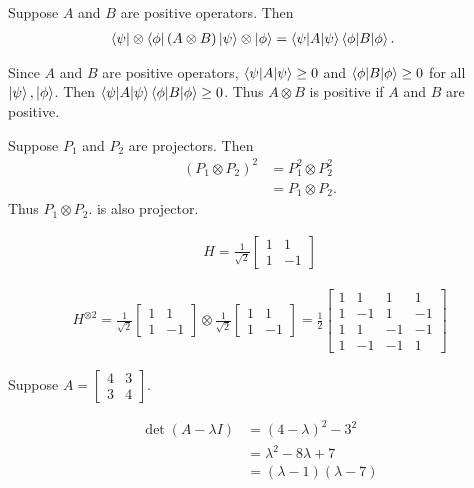 Suppose $A$ and $B$ are positive operators. Then
\begin{align*}
	\bra{\psi} \otimes \bra{\phi} (A \otimes B) \ket{\psi} \otimes \ket{\phi} &= \braket{\psi |A| \psi} \braket{\phi | B | \phi}.
\end{align*}

Since $A$ and $B$ are positive operators,
$\braket{\psi |A| \psi} \geq 0$ and $\braket{\phi | B | \phi} \geq 0$ for all $\ket{\psi}, \ket{\phi} $.
Then $\braket{\psi |A| \psi} \braket{\phi | B | \phi} \geq 0$.
Thus $A \otimes B$ is positive if $A$ and $B$ are positive.



Suppose $P_1$ and $P_2$  are projectors. Then
\begin{align*}
	(P_1 \otimes P_2) ^2 &= P_1^2 \otimes P_2^2\\
		&= P_1 \otimes P_2.
\end{align*}
Thus $ P_1 \otimes P_2.$ is also projector.


\begin{align}
	H  = \frac{1}{\sqrt{2}} \begin{bmatrix}
		1 & 1 \\
		1 & -1
	\end{bmatrix}
\end{align}

\begin{align*}
	H^{\otimes 2}
	=
	\frac{1}{\sqrt{2}} \begin{bmatrix}
	1 & 1 \\
	1 & -1
	\end{bmatrix}
	\otimes
	\frac{1}{\sqrt{2}} \begin{bmatrix}
	1 & 1 \\
	1 & -1
	\end{bmatrix}
	=
	\frac{1}{2} \begin{bmatrix}
		1 & 1 & 1 & 1 \\
		1 & -1 & 1 & -1 \\
		1 & 1 & -1 & -1 \\
		1 & -1 & -1 & 1
	\end{bmatrix}
\end{align*}




Suppose $A = \begin{bmatrix}
4 & 3 \\
3 & 4
\end{bmatrix} $.

\begin{align*}
	\det (A - \lambda I ) &= (4-\lambda)^2 - 3^2\\
		&= \lambda^2 -8\lambda + 7\\
		&= (\lambda - 1)(\lambda - 7)
\end{align*}

